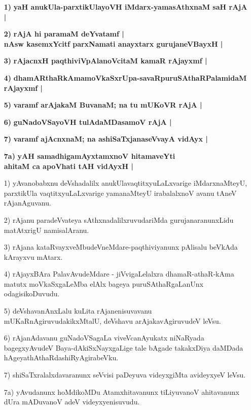 \begin{itemize}
\item [\bf 1)] {\bf yaH anukUla-parxtikUlayoVH iMdarx-yamasAthxnaM saH rAjA |}\label{94}
\item [\bf 2)] {\bf rAjA hi paramaM deYvatamf |\\\label{93} nAsw kasemxYcitf parxNamati anayxtarx gurujaneVBayxH |}
\item [\bf 3)] {\bf rAjacnxH paqthiviVpAlanoVcitaM kamaR rAjayxmf |}\label{94}
\item [\bf 4)] {\bf dhamARthaRkAmamoVkaSxrUpa-savaRpuruSAthaRPalamidaM rAjayxmf |}\label{94}
\item [\bf 5)] {\bf varamf arAjakaM BuvanaM; na tu mUKoVR rAjA |}\label{94}
\item [\bf 6)] {\bf guNadoVSayoVH tulAdaMDasamoV rAjA |}\label{94}
\item [\bf 7)] {\bf varamf ajAcnxnaM; na ashiSaTxjanaseVvayA vidAyx |}\label{94}
\item [\bf 7a)] {\bf yAH samadhigamAyxtamxnoV hitamaveYti}\\ {\bf ahitaM ca apoVhati tAH vidAyxH |}\label{94}

\item [1)] yAvanobabxnu deVshadalilx anukUlavaqtitxyuLaLxvarige iMdarxnaMteyU, parxtikUla vaqtitxyuLaLxva\-rige yamanaMteyU irabalalxnoV avanu tAneV rAjanAguvanu.
\item [2)] rAjanu paradeVvateya sAthxnadalilxruvudariMda gurujanaranunxLidu matAtxrigU namisalAranu.
\item [3)] rAjana kataRvayxveMbudeVneMdare-paqthiviyanunx pAlisalu beVkAda kArayxvu mAtarx.
\item [4)] rAjayxBAra PalavAvudeMdare - jiVvigaLelalxra dhamaR-athaR-kAma matutx moVkaSxgaLeMba elAlx\- bageya puruSAthaRgaLanUnx odagisikoDuvudu.
\item [5)] deVshavanAnxLalu kuLita rAjanenisuvavanu mUKaRnAgiruvudakikxMtalU, deVshavu arAjakavAgiru\-vudeV leVsu.
\item [6)] rAjanAdavanu guNadoVSagaLa viveVcanAyukatx niNaRyada bagegx\break yAvudeV Baya-dAkiSxNayx\-gaLige tale bAgade takakxDiya daMDada hAge\break yathAthaRdashiR\-yAgirabeVku.
\item [7)] shiSaTxralalxdavaranunx seVvisi paDeyuva videyxgiMta avideyxyeV leVsu.
\item [7a)] yAvudanunx hoMdikoMDu Atamxhitavanunx tiLiyuvanoV ahitavanunx dUra mADu\-vanoV adeV videyxyenisuvudu.


\end{itemize}
